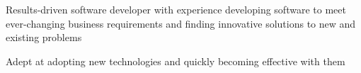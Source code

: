 %
    \begin{itemize*}
        \item Results-driven software developer with experience developing software to meet ever-changing business requirements
            and finding innovative solutions to new and existing problems
        \item Adept at adopting new technologies and quickly becoming effective with them
    \end{itemize*}
